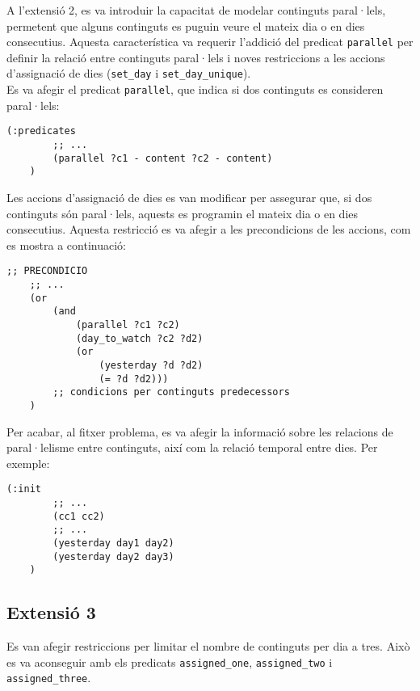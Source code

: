 \documentclass[a4paper]{article}
\begin{document}
	A l'extensió 2, es va introduir la capacitat de modelar continguts paral·lels, permetent que alguns continguts es puguin veure el mateix dia o en dies consecutius. Aquesta característica va requerir l'addició del predicat \texttt{parallel} per definir la relació entre continguts paral·lels i noves restriccions a les accions d'assignació de dies (\texttt{set\_day} i \texttt{set\_day\_unique}).\\
	
	Es va afegir el predicat \texttt{parallel}, que indica si dos continguts es consideren paral·lels:
	\begin{lstlisting}[language=PDDL, caption={Definició del predicat \texttt{parallel}}, label={lst:predicatParallel}]
	(:predicates
		;; ...
		(parallel ?c1 - content ?c2 - content)
	)
	\end{lstlisting}
	
	Les accions d'assignació de dies es van modificar per assegurar que, si dos continguts són paral·lels, aquests es programin el mateix dia o en dies consecutius. Aquesta restricció es va afegir a les precondicions de les accions, com es mostra a continuació:
	
	\begin{lstlisting}[language=PDDL, caption={Restriccions per continguts paral·lels}, label={lst:extensio2}]
	;; PRECONDICIO
	;; ...
	(or
		(and 
			(parallel ?c1 ?c2)
		 	(day_to_watch ?c2 ?d2)
		 	(or
				(yesterday ?d ?d2)
				(= ?d ?d2)))
		;; condicions per continguts predecessors
	)
	\end{lstlisting}
	
	Per acabar, al fitxer problema, es va afegir la informació sobre les relacions de paral·lelisme entre continguts, així com la relació temporal entre dies. Per exemple:
	
	\begin{lstlisting}[language=PDDL, caption={Inicialització de paral·lels i dies consecutius}, label={lst:iniExtensio2}]
	(:init
		;; ...
		(cc1 cc2)
		;; ...
		(yesterday day1 day2)
		(yesterday day2 day3)
	)
	\end{lstlisting}
	

	
	\subsection*{Extensió 3}
	Es van afegir restriccions per limitar el nombre de continguts per dia a tres. Això es va aconseguir amb els predicats \texttt{assigned\_one}, \texttt{assigned\_two} i \texttt{assigned\_three}. 
	
\end{document}
